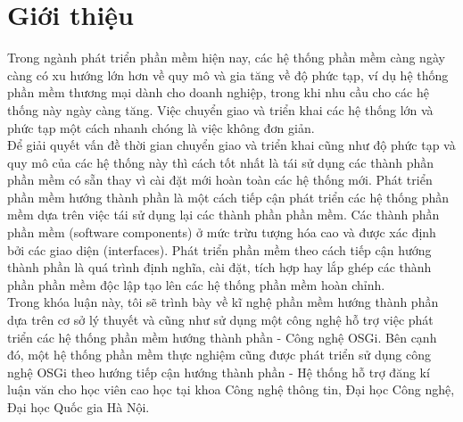 \chapter{Giới thiệu}


Trong ngành phát triển phần mềm hiện nay, các hệ thống phần mềm càng ngày càng có xu hướng lớn hơn về quy mô và gia tăng về độ phức tạp, ví dụ hệ thống phần mềm thương mại dành cho doanh nghiệp, trong khi nhu cầu cho các hệ thống này ngày càng tăng. Việc chuyển giao và triển khai các hệ thống lớn và phức tạp một cách nhanh chóng là việc không đơn giản. \\

Để giải quyết vấn đề thời gian chuyển giao và triển khai cũng như độ phức tạp và quy mô của các hệ thống này thì cách tốt nhất là tái sử dụng các thành phần phần mềm có sẵn thay vì cài đặt mới hoàn toàn các hệ thống mới.
Phát triển phần mềm hướng thành phần là một cách tiếp cận phát triển các hệ thống phần mềm dựa trên việc tái sử dụng lại các thành phần phần mềm.
Các thành phần phần mềm (software components) ở mức trừu tượng hóa cao và được xác định bởi các giao diện (interfaces). Phát triển phần mềm theo cách tiếp cận hướng thành phần là quá trình định nghĩa, cài đặt, tích hợp hay lắp ghép các thành phần phần mềm độc lập tạo lên các hệ thống phần mềm hoàn chỉnh.\\

Trong khóa luận này, tôi sẽ trình bày về kĩ nghệ phần mềm hướng thành phần dựa trên cơ sở lý thuyết và cũng như sử dụng một công nghệ hỗ trợ việc phát triển các hệ thống phần mềm hướng thành phần - Công nghệ OSGi. Bên cạnh đó, một hệ thống phần mềm thực nghiệm cũng được phát triển sử dụng công nghệ OSGi theo hướng tiếp cận hướng thành phần - Hệ thống hỗ trợ đăng kí luận văn cho học viên cao học tại khoa Công nghệ thông tin, Đại học Công nghệ, Đại học Quốc gia Hà Nội.
